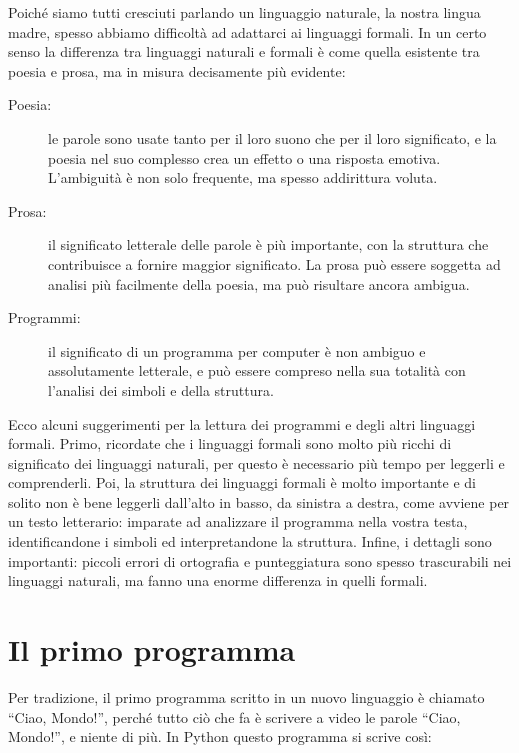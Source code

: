 \documentclass[10pt]{book}
\begin{document}
Poiché siamo tutti cresciuti parlando un linguaggio naturale, la nostra lingua madre, spesso abbiamo difficoltà ad adattarci ai linguaggi formali. In un certo senso la differenza tra linguaggi naturali e formali è come quella esistente tra poesia e prosa, ma in misura decisamente più evidente:

\begin{description}

\item[Poesia:] le parole sono usate tanto per il loro suono che per il loro     significato, e la poesia nel suo complesso crea un effetto o una risposta emotiva. L'ambiguità è non solo frequente, ma spesso addirittura voluta.

\item[Prosa:] il significato letterale delle parole è più importante, con la    struttura che contribuisce a fornire maggior significato. La prosa può essere soggetta ad analisi più facilmente della poesia, ma può risultare ancora ambigua.

\item[Programmi:] il significato di un programma per computer è non ambiguo e    assolutamente letterale, e può essere compreso nella sua totalità con l'analisi dei simboli e della struttura.

\end{description}

Ecco alcuni suggerimenti per la lettura dei programmi e degli altri linguaggi formali. Primo, ricordate che i linguaggi formali sono molto più ricchi di       significato dei linguaggi naturali, per questo è necessario più tempo per leggerli e comprenderli. Poi, la struttura dei linguaggi formali è molto importante e di solito non è bene leggerli dall'alto in basso, da sinistra a destra, come avviene per un testo letterario: imparate ad analizzare il programma nella vostra testa, identificandone i simboli ed interpretandone la struttura. Infine, i dettagli sono importanti: piccoli errori di ortografia e punteggiatura sono spesso trascurabili nei linguaggi naturali, ma fanno una enorme differenza in quelli formali.


\section{Il primo programma}
\label{hello}

Per tradizione, il primo programma scritto in un nuovo linguaggio è
chiamato ``Ciao, Mondo!'', perché tutto ciò che fa è scrivere a video le parole ``Ciao, Mondo!'', e niente di più. In Python questo programma si scrive così:
\end{document}
